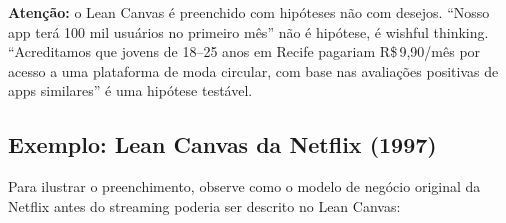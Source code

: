\documentclass[11pt, a4paper]{article}
\newcommand{\fimRotulo}{\par\vspace{2pt}}
\begin{document}
\textbf{Atenção:} o Lean Canvas é preenchido com hipóteses \textemdash{} não
com desejos. ``Nosso app terá 100 mil usuários no primeiro mês'' não é hipótese,
é wishful thinking. ``Acreditamos que jovens de 18--25 anos em Recife pagariam
R\$\,9,90/mês por acesso a uma plataforma de moda circular, com base nas
avaliações positivas de apps similares'' é uma hipótese testável.

\fimRotulo
\subsection{Exemplo: Lean Canvas da Netflix (1997)}

Para ilustrar o preenchimento, observe como o modelo de negócio original da
Netflix \textemdash{} antes do streaming \textemdash{} poderia ser descrito
no Lean Canvas:

\vspace{8pt}
\end{document}
